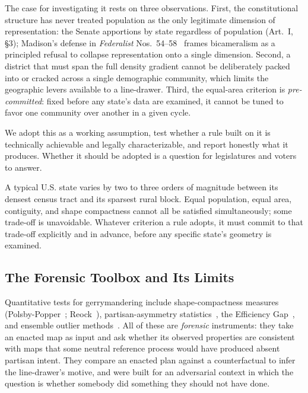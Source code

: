 The case for investigating it rests on three observations. First,
the constitutional structure has never treated population as the
only legitimate dimension of representation: the Senate apportions
by state regardless of population (Art.~I, \S3); Madison's defense
in \emph{Federalist} Nos.~54--58~\cite{federalist54} frames
bicameralism as a principled refusal to collapse representation onto
a single dimension. Second, a district that must span the full
density gradient cannot be deliberately packed into or cracked across
a single demographic community, which limits the geographic levers
available to a line-drawer. Third, the equal-area criterion is
\emph{pre-committed}: fixed before any state's data are examined,
it cannot be tuned to favor one community over another in a given cycle.

We adopt this as a working assumption, test whether a rule built on
it is technically achievable and legally characterizable, and report
honestly what it produces. Whether it should be adopted is a question
for legislatures and voters to answer.

A typical U.S. state varies by two to three orders of magnitude
between its densest census tract and its sparsest rural block. Equal
population, equal area, contiguity, and shape compactness cannot all
be satisfied simultaneously; some trade-off is unavoidable. Whatever
criterion a rule adopts, it must commit to that trade-off explicitly
and in advance, before any specific state's geometry is examined.

\subsection{The Forensic Toolbox and Its Limits}
\label{sec:intro-forensic}

Quantitative tests for gerrymandering include shape-compactness
measures (Polsby-Popper~\cite{polsbypopper1991};
Reock~\cite{reock1961}), partisan-asymmetry
statistics~\cite{wang2016,warrington2018}, the Efficiency
Gap~\cite{stephanopoulosmcghee2015}, and ensemble outlier
methods~\cite{mattinglyduke,recom2021}. All of these are
\emph{forensic} instruments: they take an enacted map as input and
ask whether its observed properties are consistent with maps that
some neutral reference process would have produced absent partisan
intent. They compare an enacted plan against a counterfactual to
infer the line-drawer's motive, and were built for an adversarial
context in which the question is whether somebody did something they
should not have done.

